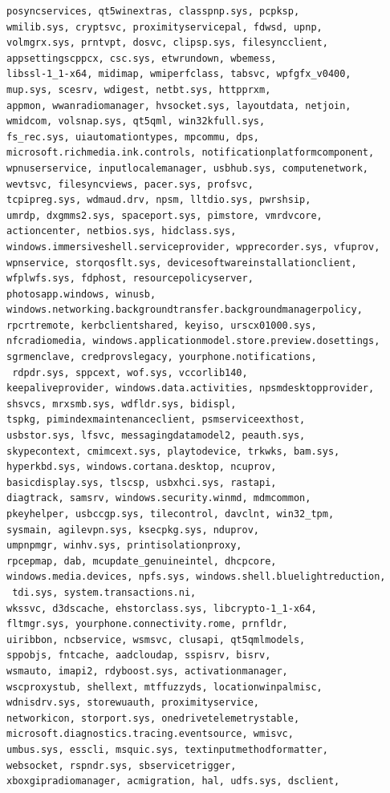 \documentclass[a4paper,twoside,12pt]{book}
\begin{document}
\begin{appendices}
\begin{lstlisting}[label={lst:dlls},caption={All gathered DLL's},escapeinside=``,basicstyle=\tiny,breaklines=true]
posyncservices, qt5winextras, classpnp.sys, pcpksp, 
wmilib.sys, cryptsvc, proximityservicepal, fdwsd, upnp, 
volmgrx.sys, prntvpt, dosvc, clipsp.sys, filesyncclient, 
appsettingscppcx, csc.sys, etwrundown, wbemess, 
libssl-1_1-x64, midimap, wmiperfclass, tabsvc, wpfgfx_v0400, 
mup.sys, scesrv, wdigest, netbt.sys, httpprxm, 
appmon, wwanradiomanager, hvsocket.sys, layoutdata, netjoin, 
wmidcom, volsnap.sys, qt5qml, win32kfull.sys, 
fs_rec.sys, uiautomationtypes, mpcommu, dps, 
microsoft.richmedia.ink.controls, notificationplatformcomponent, 
wpnuserservice, inputlocalemanager, usbhub.sys, computenetwork, 
wevtsvc, filesyncviews, pacer.sys, profsvc, 
tcpipreg.sys, wdmaud.drv, npsm, lltdio.sys, pwrshsip, 
umrdp, dxgmms2.sys, spaceport.sys, pimstore, vmrdvcore, 
actioncenter, netbios.sys, hidclass.sys, 
windows.immersiveshell.serviceprovider, wpprecorder.sys, vfuprov, 
wpnservice, storqosflt.sys, devicesoftwareinstallationclient, 
wfplwfs.sys, fdphost, resourcepolicyserver, 
photosapp.windows, winusb, 
windows.networking.backgroundtransfer.backgroundmanagerpolicy, 
rpcrtremote, kerbclientshared, keyiso, urscx01000.sys, 
nfcradiomedia, windows.applicationmodel.store.preview.dosettings, 
sgrmenclave, credprovslegacy, yourphone.notifications,
 rdpdr.sys, sppcext, wof.sys, vccorlib140, 
keepaliveprovider, windows.data.activities, npsmdesktopprovider, 
shsvcs, mrxsmb.sys, wdfldr.sys, bidispl, 
tspkg, pimindexmaintenanceclient, psmserviceexthost, 
usbstor.sys, lfsvc, messagingdatamodel2, peauth.sys, 
skypecontext, cmimcext.sys, playtodevice, trkwks, bam.sys, 
hyperkbd.sys, windows.cortana.desktop, ncuprov, 
basicdisplay.sys, tlscsp, usbxhci.sys, rastapi, 
diagtrack, samsrv, windows.security.winmd, mdmcommon, 
pkeyhelper, usbccgp.sys, tilecontrol, davclnt, win32_tpm, 
sysmain, agilevpn.sys, ksecpkg.sys, nduprov, 
umpnpmgr, winhv.sys, printisolationproxy, 
rpcepmap, dab, mcupdate_genuineintel, dhcpcore, 
windows.media.devices, npfs.sys, windows.shell.bluelightreduction,
 tdi.sys, system.transactions.ni, 
wkssvc, d3dscache, ehstorclass.sys, libcrypto-1_1-x64, 
fltmgr.sys, yourphone.connectivity.rome, prnfldr, 
uiribbon, ncbservice, wsmsvc, clusapi, qt5qmlmodels, 
sppobjs, fntcache, aadcloudap, sspisrv, bisrv, 
wsmauto, imapi2, rdyboost.sys, activationmanager, 
wscproxystub, shellext, mtffuzzyds, locationwinpalmisc, 
wdnisdrv.sys, storewuauth, proximityservice, 
networkicon, storport.sys, onedrivetelemetrystable, 
microsoft.diagnostics.tracing.eventsource, wmisvc, 
umbus.sys, esscli, msquic.sys, textinputmethodformatter, 
websocket, rspndr.sys, sbservicetrigger, 
xboxgipradiomanager, acmigration, hal, udfs.sys, dsclient, 

\end{lstlisting}
\end{appendices}
\end{document}
